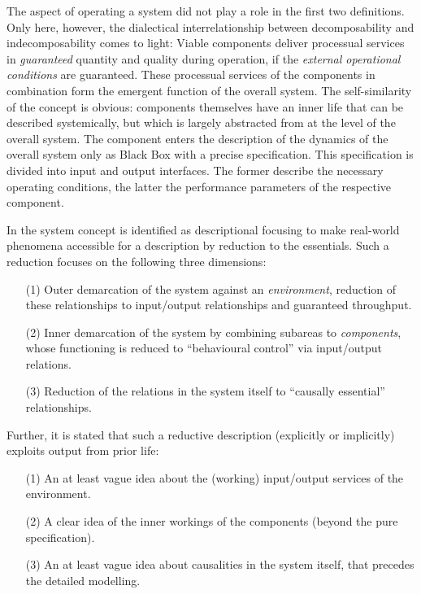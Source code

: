 \documentclass[11pt,a4paper]{article}
\begin{document}
The aspect of operating a system did not play a role in the first two
definitions.  Only here, however, the dialectical interrelationship between
decomposability and indecomposability comes to light: Viable components
deliver processual services in \emph{guaranteed} quantity and quality during
operation, if the \emph{external operational conditions} are guaranteed.
These processual services of the components in combination form the emergent
function of the overall system. The self-similarity of the concept is obvious:
components themselves have an inner life that can be described systemically,
but which is largely abstracted from at the level of the overall system. The
component enters the description of the dynamics of the overall system only as
Black Box with a precise specification.  This specification is divided into
input and output interfaces.  The former describe the necessary operating
conditions, the latter the performance parameters of the respective component.

In \cite{Graebe2020} the system concept is identified as descriptional
focusing to make real-world phenomena accessible for a description by
reduction to the essentials.  Such a reduction focuses on the following three
dimensions:
\begin{itemize}
\item[(1)] Outer demarcation of the system against an \emph{environment},
  reduction of these relationships to input/output relationships and
  guaranteed throughput.
\item[(2)] Inner demarcation of the system by combining subareas to
  \emph{components}, whose functioning is reduced to “behavioural control” via
  input/output relations.
\item[(3)] Reduction of the relations in the system itself to “causally
  essential” relationships.
\end{itemize}
Further, it is stated that such a reductive description (explicitly or
implicitly) exploits output from prior life:
\begin{itemize}
\item[(1)] An at least vague idea about the (working) input/output services of
  the environment.
\item[(2)] A clear idea of the inner workings of the components (beyond the
  pure specification).
\item[(3)] An at least vague idea about causalities in the system itself, that
  precedes the detailed modelling.
\end{itemize}
\end{document}
